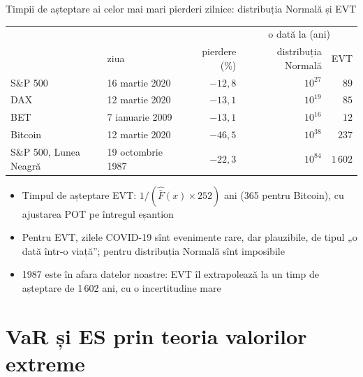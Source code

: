 \begin{frame}{Timpii de așteptare ai celor mai mari pierderi zilnice: distribuția Normală și EVT}
\itemsize{\footnotesize}
\begin{center}
\footnotesize
\begin{tabular}{llrrr}
\toprule
& & & \multicolumn{2}{c}{o dată la (ani)} \\ & ziua & pierdere (\%) & distribuția Normală & EVT \\
\midrule
S\&P 500 & 16 martie 2020 & ${-12{,}8}$ & $10^{27}$ & $89$ \\
DAX & 12 martie 2020 & ${-13{,}1}$ & $10^{19}$ & $85$ \\
BET & 7 ianuarie 2009 & ${-13{,}1}$ & $10^{16}$ & $12$ \\
Bitcoin & 12 martie 2020 & ${-46{,}5}$ & $10^{38}$ & $237$ \\
S\&P 500, Lunea Neagră & 19 octombrie 1987 & $-22{,}3$ & $10^{84}$ & $1\,602$ \\
\bottomrule
\end{tabular}
\end{center}
\begin{itemize}
    \item Timpul de așteptare EVT: $1/(\hat{\bar F}(x) \times 252)$ ani (365 pentru Bitcoin), cu ajustarea POT pe întregul eșantion
    \item Pentru EVT, zilele COVID-19 sînt evenimente rare, dar plauzibile, de tipul „o dată într-o viață”; pentru distribuția Normală sînt imposibile
    \item 1987 este în afara datelor noastre: EVT îl extrapolează la un timp de așteptare de 1\,602 ani, cu o incertitudine mare
\end{itemize}
\end{frame}


\section{VaR și ES prin teoria valorilor extreme}

